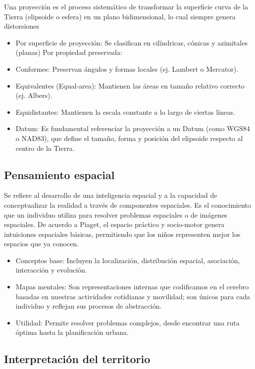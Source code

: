 \documentclass[
  letterpaper,
  DIV=11,
  numbers=noendperiod]{scrreprt}
\providecommand{\tightlist}{%
  \setlength{\itemsep}{0pt}\setlength{\parskip}{0pt}}\usepackage{longtable,booktabs,array}
\begin{document}
Una proyección es el proceso sistemático de transformar la superficie
curva de la Tierra (elipsoide o esfera) en un plano bidimensional, lo
cual siempre genera distorsiones

\begin{itemize}
\tightlist
\item
  Por superficie de proyección: Se clasifican en cilíndricas, cónicas y
  azimitales (planas) Por propiedad preservada:
\item
  Conformes: Preservan ángulos y formas locales (ej. Lambert o
  Mercator).
\item
  Equivalentes (Equal-area): Mantienen las áreas en tamaño relativo
  correcto (ej. Albers).
\item
  Equidistantes: Mantienen la escala constante a lo largo de ciertas
  líneas.
\item
  Datum: Es fundamental referenciar la proyección a un Datum (como WGS84
  o NAD83), que define el tamaño, forma y posición del elipsoide
  respecto al centro de la Tierra.
\end{itemize}

\subsection{Pensamiento espacial}\label{pensamiento-espacial}

Se refiere al desarrollo de una inteligencia espacial y a la capacidad
de conceptualizar la realidad a través de componentes espaciales. Es el
conocimiento que un individuo utiliza para resolver problemas espaciales
o de imágenes espaciales. De acuerdo a Piaget, el espacio práctico y
socio-motor genera intuiciones espaciales básicas, permitiendo que los
niños representen mejor los espacios que ya conocen.

\begin{itemize}
\tightlist
\item
  Conceptos base: Incluyen la localización, distribución espacial,
  asociación, interacción y evolución.
\item
  Mapas mentales: Son representaciones internas que codificamos en el
  cerebro basadas en nuestras actividades cotidianas y movilidad; son
  únicos para cada individuo y reflejan sus procesos de abstracción.
\item
  Utilidad: Permite resolver problemas complejos, desde encontrar una
  ruta óptima hasta la planificación urbana.
\end{itemize}

\subsection{Interpretación del
territorio}\label{interpretaciuxf3n-del-territorio}
\end{document}
